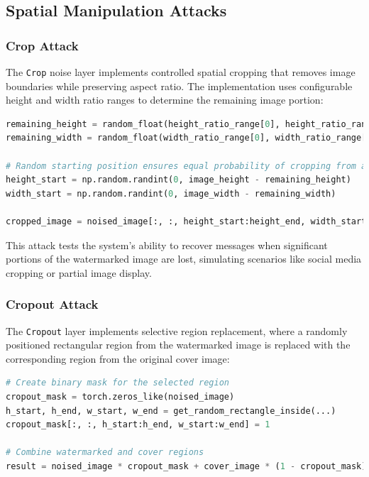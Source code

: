 \documentclass[12pt,a4paper]{report}
\begin{document}
\subsection{Spatial Manipulation Attacks}

\subsubsection{Crop Attack}
The \texttt{Crop} noise layer implements controlled spatial cropping that removes image boundaries while preserving aspect ratio. The implementation uses configurable height and width ratio ranges to determine the remaining image portion:

\begin{lstlisting}[language=Python, caption=Crop Attack Implementation]
remaining_height = random_float(height_ratio_range[0], height_ratio_range[1]) * image_height
remaining_width = random_float(width_ratio_range[0], width_ratio_range[1]) * image_width

# Random starting position ensures equal probability of cropping from all sides
height_start = np.random.randint(0, image_height - remaining_height)
width_start = np.random.randint(0, image_width - remaining_width)

cropped_image = noised_image[:, :, height_start:height_end, width_start:width_end]
\end{lstlisting}

This attack tests the system's ability to recover messages when significant portions of the watermarked image are lost, simulating scenarios like social media cropping or partial image display.

\subsubsection{Cropout Attack}
The \texttt{Cropout} layer implements selective region replacement, where a randomly positioned rectangular region from the watermarked image is replaced with the corresponding region from the original cover image:

\begin{lstlisting}[language=Python, caption=Cropout Attack Implementation]
# Create binary mask for the selected region
cropout_mask = torch.zeros_like(noised_image)
h_start, h_end, w_start, w_end = get_random_rectangle_inside(...)
cropout_mask[:, :, h_start:h_end, w_start:w_end] = 1

# Combine watermarked and cover regions
result = noised_image * cropout_mask + cover_image * (1 - cropout_mask)
\end{lstlisting}
\end{document}
